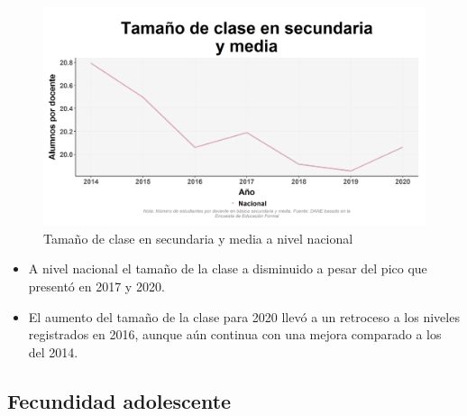     \begin{figure}[H]
        \caption{Tamaño de clase en secundaria y media a nivel nacional \label{map_result_2} }
        \begin{center}
        \includegraphics[width=\textwidth,keepaspectratio]{img/var_231_trend.png}
        \end{center}
    \end{figure}
            \begin{itemize}
                \item A nivel nacional el tamaño de la clase a disminuido a pesar del pico que presentó en 2017 y 2020.
                \item El aumento del tamaño de la clase para 2020 llevó a un retroceso a los niveles registrados en 2016, aunque aún continua con una mejora comparado a los del 2014.
                \end{itemize}

    \subsection{Fecundidad adolescente}

